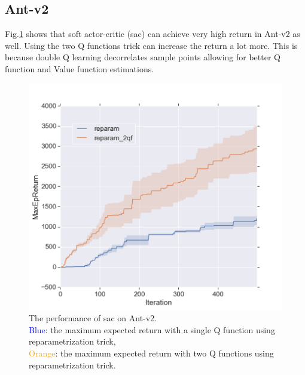 \documentclass[12pt]{article}
\begin{document}
	\pagebreak
	\subsection{Ant-v2}
	Fig.\ref{fig:ant_v2} shows that soft actor-critic (sac) can achieve very high return in Ant-v2 as well.  Using the two Q functions trick can increase the return a lot more.  This is because double Q learning decorrelates sample points allowing for better Q function and Value function estimations.
	\begin{figure}[!htbp] 
		\includegraphics[width=1.0\textwidth]{figure_2.png}
		\caption[caption]{The performance of sac on Ant-v2. \\ \hspace{0.4\textwidth}
		\textcolor{blue}{Blue}: the maximum expected return with a single Q function using reparametrization trick,\\ \hspace{0.4\textwidth} \textcolor{orange}{Orange}: the maximum expected return with two Q functions using reparametrization trick.\label{fig:ant_v2}}
	\end{figure}
  
	
\end{document}
